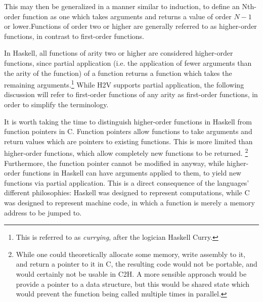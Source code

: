 \documentclass[english,onecolumn]{scrartcl}
\begin{document}
This may then be generalized in a manner similar to induction, to define an Nth-order function as one which takes arguments and
returns a value of order \(N - 1\) or lower.\footnotemark Functions of order two or higher are generally referred to as
higher-order functions, in contrast to first-order functions.

In Haskell, all functions of arity two or higher are considered higher-order functions, since partial application (i.e. the
application of fewer arguments than the arity of the function) of a function returns a function which takes the remaining
arguments.\footnote{This is referred to as \textit{currying}, after the logician Haskell Curry.}
While H2V supports partial application, the following discussion will refer to first-order functions of any arity as first-order
functions, in order to simplify the terminology.

It is worth taking the time to distinguish higher-order functions in Haskell from function pointers in C. Function pointers allow
functions to take arguments and return values which are pointers to existing functions. This is more limited than higher-order
functions, which allow completely new functions to be returned.%
\footnote{While one could theoretically allocate some memory, write assembly to it, and return a pointer to it in C, the
    resulting code would not be portable, and would certainly not be usable in C2H. A more sensible approach would be provide a
    pointer to a data structure, but this would be shared state which would prevent the function being called multiple times in
    parallel.}
Furthermore, the function pointer cannot be modified in anyway, while higher-order functions in Haskell can have arguments applied
to them, to yield new functions via partial application. This is a direct consequence of the languages' different philosophies:
Haskell was designed to represent computations, while C was designed to represent machine code, in which a function is merely a
memory address to be jumped to.
\end{document}
